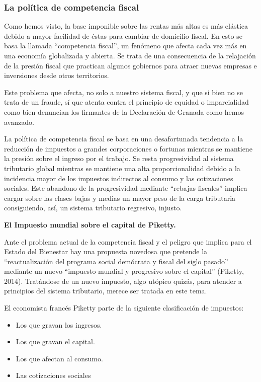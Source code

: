 \documentclass[
]{article}
\begin{document}
\hypertarget{la-poluxedtica-de-competencia-fiscal}{%
\subsubsection{La política de competencia
fiscal}\label{la-poluxedtica-de-competencia-fiscal}}

Como hemos visto, la base imponible sobre las rentas más altas es más
elástica debido a mayor facilidad de éstas para cambiar de domicilio
fiscal. En esto se basa la llamada ``competencia fiscal'', un fenómeno
que afecta cada vez más en una economía globalizada y abierta. Se trata
de una consecuencia de la relajación de la presión fiscal que practican
algunos gobiernos para atraer nuevas empresas e inversiones desde otros
territorios.

Este problema que afecta, no solo a nuestro sistema fiscal, y que si
bien no se trata de un fraude, sí que atenta contra el principio de
equidad o imparcialidad como bien denuncian los firmantes de la
Declaración de Granada como hemos avanzado.

La política de competencia fiscal se basa en una desafortunada tendencia
a la reducción de impuestos a grandes corporaciones o fortunas mientras
se mantiene la presión sobre el ingreso por el trabajo. Se resta
progresividad al sistema tributario global mientras se mantiene una alta
proporcionalidad debido a la incidencia mayor de los impuestos
indirectos al consumo y las cotizaciones sociales. Este abandono de la
progresividad mediante ``rebajas fiscales'' implica cargar sobre las
clases bajas y medias un mayor peso de la carga tributaria consiguiendo,
así, un sistema tributario regresivo, injusto.

\textbf{El Impuesto mundial sobre el capital de Piketty.}

Ante el problema actual de la competencia fiscal y el peligro que
implica para el Estado del Bienestar hay una propuesta novedosa que
pretende la ``reactualización del programa social demócrata y fiscal del
siglo pasado'' mediante un nuevo ``impuesto mundial y progresivo sobre
el capital'' (Piketty, 2014). Tratándose de un nuevo impuesto, algo
utópico quizás, para atender a principios del sistema tributario, merece
ser tratada en este tema.

El economista francés Piketty parte de la siguiente clasificación de
impuestos:

\begin{itemize}
\item
  Los que gravan los ingresos.
\item
  Los que gravan el capital.
\item
  Los que afectan al consumo.
\item
  Las cotizaciones sociales
\end{itemize}
\end{document}
